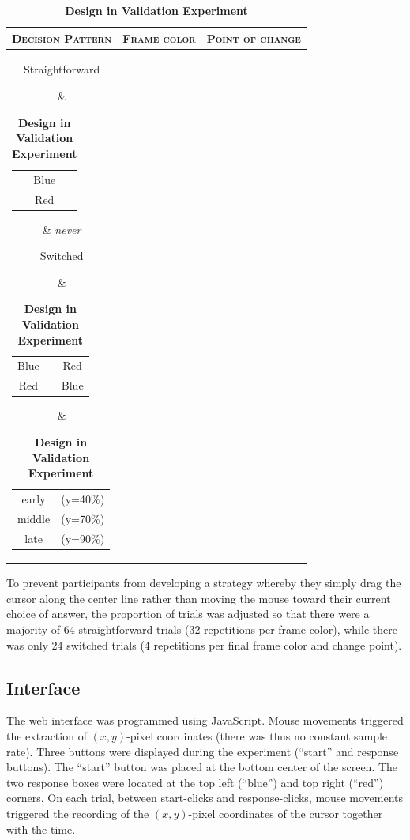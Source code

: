 \documentclass[11pt]{article}
\begin{document}
\begin{table}[!h]
\centering
\begin{tabular}{cc>{\centering\arraybackslash}c}
\textsc{Decision Pattern}& \textsc{Frame color}& \textsc{Point of change}\\
\hline
\noindent\parbox[c]{9em}{Straightforward} & 
	\begin{tabular}{c}Blue\\Red\end{tabular} &  \emph{never}\\
\hline

  \noindent\parbox[c]{9em}{Switched} & 
  \begin{tabular}{ccc}
  Blue & $\rightarrow$ & Red\\
  Red & $\rightarrow$ & Blue\\
  \end{tabular} &
  \begin{tabular}{cc}
  early & (y=40\%)\\
  middle & (y=70\%)\\
  late & (y=90\%)\\
  \end{tabular}   
\end{tabular}

\caption{\textbf{Design in Validation Experiment}}
\label{tab:design.validation}
\end{table}

To prevent participants from developing a strategy whereby they simply drag the cursor along the center line rather than moving the mouse toward their current choice of answer, the proportion of trials was adjusted so that there were a majority of 64 straightforward trials (32 repetitions per frame color), while there was only 24 switched trials (4 repetitions per final frame color and change point). 

\subsection{Interface}

The web interface was programmed using JavaScript. Mouse movements triggered the extraction of $(x,y)$-pixel coordinates (there was thus no constant sample rate).
Three buttons were displayed during the experiment (``start'' and response buttons). The ``start'' button was placed at the bottom center of the screen. The two response boxes were located at the top left (``blue'') and top right (``red'') corners. 
On each trial, between start-clicks and response-clicks, mouse movements triggered the recording of the $(x,y)$-pixel coordinates of the cursor together with the time. 
\end{document}
